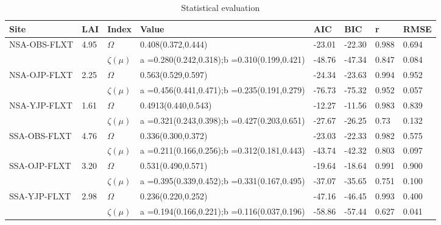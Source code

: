 \documentclass[a4paper,11pt]{report}
\begin{document}
\begin{sidewaystable}
\caption{Statistical evaluation}
\begin{tabular}{p{4.0cm} p{2.1cm} p{1.5cm} p{4.1cm} p{2.1cm} p{2.1cm} p{2.1cm} p{2.1cm}}
\hline
\hline   
\bf Site & \bf LAI &  \bf Index & \bf Value & \bf AIC & \bf BIC & \bf r &  \bf RMSE\\
 \hline
\multirow{2}{*}{NSA-OBS-FLXT} 
     & 4.95  &  \bf $\Omega$         &  0.408(0.372,0.444) & -23.01 &	-22.30	& 0.988 &	0.694\\
     &       &  \bf $\zeta(\mu)$     &  a =0.280(0.242,0.318);\newline b =0.310(0.199,0.421) & -48.76 & -47.34 & 0.847 & 0.084\\
\multirow{2}{*}{NSA-OJP-FLXT} 
     & 2.25  &  \bf $\Omega$     &  0.563(0.529,0.597) & -24.34	& -23.63 & 0.994 & 0.952\\
     &       &  \bf $\zeta(\mu)$ &  a =0.456(0.441,0.471);\newline b =0.235(0.191,0.279) & -76.73 &	-75.32	& 0.952 &	0.057\\
\multirow{2}{*}{NSA-YJP-FLXT} 
     & 1.61 &  \bf $\Omega$         &  0.4913(0.440,0.543) & -12.27 &	-11.56 &	0.983	& 0.839\\
     & &  \bf $\zeta(\mu)$          &  a =0.321(0.243,0.398);\newline b =0.427(0.203,0.651) & -27.67 &	-26.25	& 0.73 &	0.132\\
\multirow{2}{*}{SSA-OBS-FLXT} 
     & 4.76 &  \bf $\Omega$         &  0.336(0.300,0.372) & -23.03 & -22.33 & 0.982 & 0.575\\
     & &  \bf $\zeta(\mu)$          &  a =0.211(0.166,0.256);\newline b =0.312(0.181,0.443) & -43.74	& -42.32 & 0.803 & 0.097
\\
\multirow{2}{*}{SSA-OJP-FLXT} 
     & 3.20 &  \bf $\Omega$         &  0.531(0.490,0.571) & -19.64 & -18.64 & 0.991 & 0.900\\
    &  &  \bf $\zeta(\mu)$          &  a =0.395(0.339,0.452);\newline b =0.331(0.167,0.495) & -37.07 & -35.65 & 0.751 & 0.100\\
\multirow{2}{*}{SSA-YJP-FLXT} 
     & 2.98 &  \bf $\Omega$         &  0.236(0.220,0.252) & -47.16 & -46.45 & 0.993 & 0.400\\
    &  &  \bf $\zeta(\mu)$          &  a =0.194(0.166,0.221);\newline b =0.116(0.037,0.196) & -58.86 & -57.44 & 0.627 & 0.041\\

\end{tabular}
\end{sidewaystable}
\end{document}
